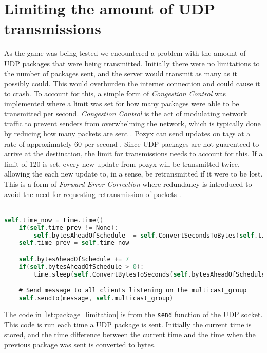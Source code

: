 \section{Limiting the amount of UDP transmissions}\label{sec:sprint5-transmissionlimit}
As the game was being tested we encountered a problem with the amount of UDP packages that were being transmitted.
Initially there were no limitations to the number of packages sent, and the server would transmit as many as it possibly could.
This would overburden the internet connection and could cause it to crash.
To account for this, a simple form of \textit{Congestion Control} was implemented where a limit was set for how many packages were able to be transmitted per second.
\textit{Congestion Control} is the act of modulating network traffic to prevent senders from overwhelming the network, which is typically done by reducing how many packets are sent \cite{CongestionControl}.
Pozyx can send updates on tags at a rate of approximately 60 per second \cite{pozyx-Performance}.
Since UDP packages are not guarenteed to arrive at the destination, the limit for transmissions needs to account for this.
If a limit of 120 is set, every new update from pozyx will be transmitted twice, allowing the each new update to, in a sense, be retransmitted if it were to be lost.
This is a form of \textit{Forward Error Correction} where redundancy is introduced to avoid the need for requesting retransmission of packets \cite{ForwardErrorCorrection}.
\\\\
\begin{lstlisting}[caption={Implementaion of the limit on the amount of packages that can be sent per second}, captionpos=b,language=C,label={lst:package_limitation}]
    self.time_now = time.time()
    if(self.time_prev != None):
        self.bytesAheadOfSchedule -= self.ConvertSecondsToBytes(self.time_now - self.time_prev)
    self.time_prev = self.time_now

    self.bytesAheadOfSchedule += 7
    if(self.bytesAheadOfSchedule > 0):
        time.sleep(self.ConvertBytesToSeconds(self.bytesAheadOfSchedule))

    # Send message to all clients listening on the multicast_group
    self.sendto(message, self.multicast_group)
\end{lstlisting}
The code in \autoref{lst:package_limitation} is from the \texttt{send} function of the UDP socket.
This code is run each time a UDP package is sent.
Initially the current time is stored, and the time difference between the current time and the time when the previous package was sent is converted to bytes.
